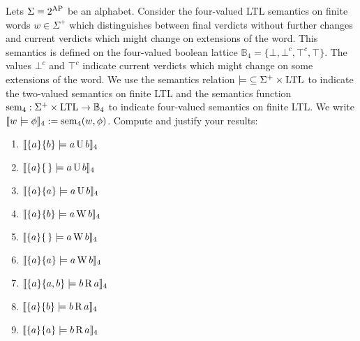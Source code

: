 \documentclass[language=en,sheet=7,prefix]{exercise}
\newcommand{\sem}[1]{\llbracket #1\rrbracket}
\begin{document}

Lets $\Sigma = 2^{\operatorname{AP}}$ be an alphabet. Consider the four-valued LTL semantics on finite words $w \in \Sigma^+$ which distinguishes between final verdicts without further changes and current verdicts which might change on extensions of the word. This semantics is defined on the four-valued boolean lattice $\mathbb B_4 = \{ \bot, \bot^c, \top^c, \top \}$. The values $\bot^c$ and $\top^c$ indicate current verdicts which might change on some extensions of the word. We use the semantics relation $\operatorname{\models} \subseteq \Sigma^+ \times \operatorname{LTL}$ to indicate the two-valued semantics on finite LTL and the semantics function $\operatorname{sem}_4 : \Sigma^+ \times \operatorname{LTL} \to \mathbb B_4$ to indicate four-valued semantics on finite LTL. We write $\sem{w \models \phi}_4 := \op{sem}_4(w, \phi)$. Compute and justify your results:

\begin{enumerate}
  \item $\sem{\{a\}\{b\} \models a \LTLuntil b}_4$
  \item $\sem{\{a\}\{\,\} \models a \LTLuntil b}_4$
  \item $\sem{\{a\}\{a\} \models a \LTLuntil b}_4$
  \item $\sem{\{a\}\{b\} \models a \LTLweakuntil b}_4$
  \item $\sem{\{a\}\{\,\} \models a \LTLweakuntil b}_4$
  \item $\sem{\{a\}\{a\} \models a \LTLweakuntil b}_4$
  \item $\sem{\{a\}\{a,b\} \models b \LTLrelease a}_4$
  \item $\sem{\{a\}\{b\} \models b \LTLrelease a}_4$
  \item $\sem{\{a\}\{a\} \models b \LTLrelease a}_4$
\end{enumerate}
\end{document}
